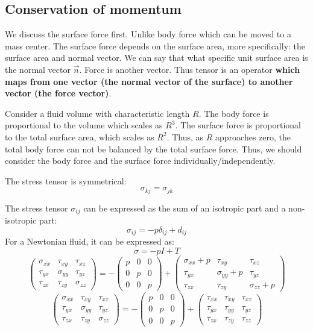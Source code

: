 \documentclass[11pt]{article} %
\begin{document}
\subsection{Conservation of momentum}
\hspace{5mm} We discuss the surface force first. Unlike body force which can be moved to a mass center. The surface force depends on the surface area, more specifically: the surface area and normal vector. We can say that what specific unit surface area is the normal vector $\vec{n}$. Force is another vector. Thus tensor is an operator \textbf{which maps from one vector (the normal vector of the surface) to another vector (the force vector)}. \par
Consider a fluid volume with characteristic length $R$. The body force is proportional to the volume which scales as $R^{3}$. The surface force is proportional to the total surface area, which scales as $R^{2}$. Thus, as $R$ approaches zero, the total body force can not be balanced by the total surface force. Thus, we should consider the body force and the surface force individually/independently.\par
 The stress tensor is symmetrical:
 $$
 \sigma_{kj} =  \sigma_{jk} 
 $$\par
 The stress tensor $ \sigma_{ij}$ can be expressed as the sum of an isotropic part and a non-isotropic part:
$$
  \sigma_{ij} = -p\delta_{ij} +d_{ij}
 $$
 For a Newtonian fluid, it can be expressed as:
 $$
 \sigma = -pI +T
 $$
$$
\left(
\begin{array} {ccc}
\sigma_{xx} & \tau_{xy} & \tau_{xz} \\
\tau_{yx} & \sigma_{yy} & \tau_{yz} \\
\tau_{zx} & \tau_{zy} &\sigma_{zz}
\end{array}
\right)
=-
\left(
\begin{array} {ccc}
p & 0 & 0 \\
0 & p & 0 \\
0 & 0 &p
\end{array}
\right) +
\left(
\begin{array} {ccc}
\sigma_{xx} + p & \tau_{xy} & \tau_{xz} \\
\tau_{yx} & \sigma_{yy} + p& \tau_{yz} \\
\tau_{zx} & \tau_{zy} &\sigma_{zz}+ p
\end{array}
\right)
$$
$$
\left(
\begin{array} {ccc}
\sigma_{xx} & \tau_{xy} & \tau_{xz} \\
\tau_{yx} & \sigma_{yy} & \tau_{yz} \\
\tau_{zx} & \tau_{zy} &\sigma_{zz}
\end{array}
\right)
=-
\left(
\begin{array} {ccc}
p & 0 & 0 \\
0 & p & 0 \\
0 & 0 &p
\end{array}
\right) +
\left(
\begin{array} {ccc}
\tau_{xx}  & \tau_{xy} & \tau_{xz} \\
\tau_{yx} & \tau_{yy}& \tau_{yz} \\
\tau_{zx} & \tau_{zy} &\tau_{zz}
\end{array}
\right)
$$
\end{document}
